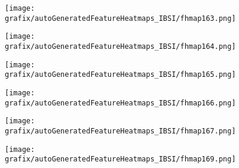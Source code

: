 \hspace{\hsp} 
\begin{subfigure}{\wid\textwidth} 
    \centering 
    \caption{\tiny \sffamily {}} 
    \vspace{\vsp} 
    \texttt{[image: grafix/autoGeneratedFeatureHeatmaps\_IBSI/fhmap163.png]} 
\end{subfigure} 
\hspace{\hsp} 
\begin{subfigure}{\wid\textwidth} 
    \centering 
    \caption{\tiny \sffamily {}} 
    \vspace{\vsp} 
    \texttt{[image: grafix/autoGeneratedFeatureHeatmaps\_IBSI/fhmap164.png]} 
\end{subfigure} 
\hspace{\hsp} 
\begin{subfigure}{\wid\textwidth} 
    \centering 
    \caption{\tiny \sffamily {}} 
    \vspace{\vsp} 
    \texttt{[image: grafix/autoGeneratedFeatureHeatmaps\_IBSI/fhmap165.png]} 
\end{subfigure} 
\hspace{\hsp} 
\begin{subfigure}{\wid\textwidth} 
    \centering 
    \caption{\tiny \sffamily {}} 
    \vspace{\vsp} 
    \texttt{[image: grafix/autoGeneratedFeatureHeatmaps\_IBSI/fhmap166.png]} 
\end{subfigure} 
\hspace{\hsp} 
\begin{subfigure}{\wid\textwidth} 
    \centering 
    \caption{\tiny \sffamily {}} 
    \vspace{\vsp} 
    \texttt{[image: grafix/autoGeneratedFeatureHeatmaps\_IBSI/fhmap167.png]} 
\end{subfigure} 
\hspace{\hsp} 
\begin{subfigure}{\wid\textwidth} 
    \centering 
    \caption{\small \sffamily {}} 
\end{subfigure} 
\hspace{\hsp} 
\begin{subfigure}{\wid\textwidth} 
    \centering 
    \caption{\tiny \sffamily {}} 
    \vspace{\vsp} 
    \texttt{[image: grafix/autoGeneratedFeatureHeatmaps\_IBSI/fhmap169.png]} 
\end{subfigure} 
